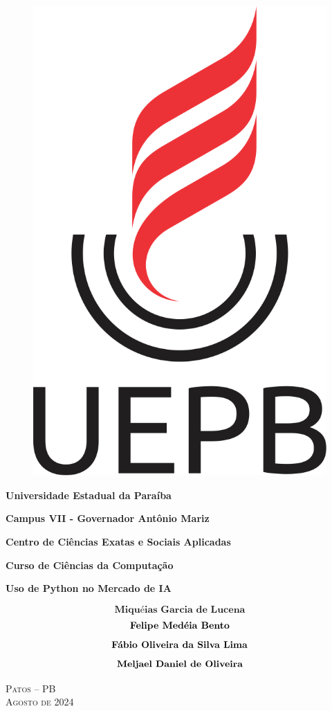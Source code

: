 \thispagestyle{empty}
\begin{center}

\begin{singlespace}
\begin{figure}[!htb]
    \centering
    \includegraphics[width=0.1\linewidth]{Photos/logo-uepb.png}
\end{figure}
{\Large{\textbf{ Universidade Estadual da Paraíba }}}

{\large{\textbf{ Campus VII - Governador Antônio Mariz }}}

{\large{\textbf{ Centro de Ciências Exatas e Sociais Aplicadas }}}

{\large{\textbf{ Curso de Ciências da Computação }}}
\end{singlespace}


\vspace{4.0cm}

\textbf{ \huge{{ Uso de Python no Mercado de IA }}}

\vspace {3cm}

{\Large{$$\textbf {Miquéias Garcia de Lucena}$$$$\newline\textbf {Felipe Medéia Bento}$$$$\newline\textbf {Fábio Oliveira da Silva Lima}$$$$\newline\textbf {Meljael Daniel de Oliveira}$$}}

\vspace{3cm}

\begin{singlespace}

\large{\textsc{Patos -- PB}}\\
\large{\textsc{Agosto de 2024}}

\end{singlespace}

\end{center}

\pagebreak


\thispagestyle{empty}

